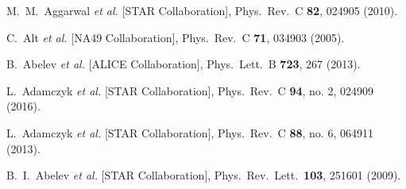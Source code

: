 \begin{thebibliography}{99}
  M.~M.~Aggarwal {\it et al.} [STAR Collaboration],
  Phys.\ Rev.\ C {\bf 82}, 024905 (2010).

\cite{Alt:2004gx}
 C.~Alt {\it et al.} [NA49 Collaboration],
  Phys.\ Rev.\ C {\bf 71}, 034903 (2005).

  B.~Abelev {\it et al.} [ALICE Collaboration],
  Phys.\ Lett.\ B {\bf 723}, 267 (2013).


  L.~Adamczyk {\it et al.} [STAR Collaboration],
  Phys.\ Rev.\ C {\bf 94}, no. 2, 024909 (2016).

  L.~Adamczyk {\it et al.} [STAR Collaboration],
  Phys.\ Rev.\ C {\bf 88}, no. 6, 064911 (2013).

  B.~I.~Abelev {\it et al.} [STAR Collaboration],
  Phys.\ Rev.\ Lett.\  {\bf 103}, 251601 (2009).
	

\end{thebibliography}
